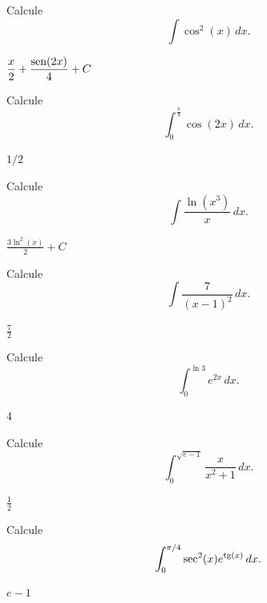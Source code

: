 \begin{exer}
  Calcule
  \begin{equation}
    \int \cos^2(x)\,dx.
  \end{equation}
\end{exer}
\begin{resp}
  $\displaystyle \frac{x}{2} + \frac{\operatorname{sen}(2x)}{4} + C$
\end{resp}

\begin{exer}
  Calcule
  \begin{equation}
    \int_0^{\frac{\pi}{4}}\cos(2x)\,dx.
  \end{equation}
\end{exer}
\begin{resp}
  $1/2$
\end{resp}

\begin{exer}
  Calcule
  \begin{equation}
    \int \frac{\ln(x^3)}{x}\,dx.
  \end{equation}
\end{exer}
\begin{resp}
  $\displaystyle \frac{3\ln^2(x)}{2} + C$
\end{resp}

\begin{exer}
  Calcule
  \begin{equation}
    \int \frac{7}{(x-1)^2}\,dx.
  \end{equation}
\end{exer}
\begin{resp}
  $\frac{7}{2}$
\end{resp}

\begin{exer}
  Calcule
  \begin{equation}
    \int_0^{\ln 3} e^{2x}\,dx.
  \end{equation}
\end{exer}
\begin{resp}
  $4$
\end{resp}

\begin{exer}
  Calcule
  \begin{equation}
    \int_0^{\sqrt{e-1}} \frac{x}{x^2+1}\,dx.
  \end{equation}
\end{exer}
\begin{resp}
  $\frac{1}{2}$
\end{resp}

\begin{exer}
  Calcule
  \begin{equation}
    \int_0^{\pi/4} \sec^2(x)e^{\operatorname{tg}(x)}\,dx.
  \end{equation}
\end{exer}
\begin{resol}
  $e-1$
\end{resol}


